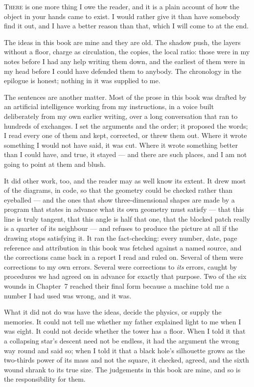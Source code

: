 
\lettrine{T}{here} is one more thing I owe the reader, and it is a plain account of how the object in your hands came to exist. I would rather give it than have somebody find it out, and I have a better reason than that, which I will come to at the end.

The ideas in this book are mine and they are old. The shadow push, the layers without a floor, charge as circulation, the copies, the local ratio: those were in my notes before I had any help writing them down, and the earliest of them were in my head before I could have defended them to anybody. The chronology in the epilogue is honest; nothing in it was supplied to me.

The sentences are another matter. Most of the prose in this book was drafted by an artificial intelligence working from my instructions, in a voice built deliberately from my own earlier writing, over a long conversation that ran to hundreds of exchanges. I set the arguments and the order; it proposed the words; I read every one of them and kept, corrected, or threw them out. Where it wrote something I would not have said, it was cut. Where it wrote something better than I could have, and true, it stayed --- and there are such places, and I am not going to point at them and blush.

It did other work, too, and the reader may as well know its extent. It drew most of the diagrams, in code, so that the geometry could be checked rather than eyeballed --- and the ones that show three-dimensional shapes are made by a program that states in advance what its own geometry must satisfy --- that this line is truly tangent, that this angle is half that one, that the blocked patch really is a quarter of its neighbour --- and refuses to produce the picture at all if the drawing stops satisfying it. It ran the fact-checking: every number, date, page reference and attribution in this book was fetched against a named source, and the corrections came back in a report I read and ruled on. Several of them were corrections to my own errors. Several were corrections to \emph{its} errors, caught by procedures we had agreed on in advance for exactly that purpose. Two of the six wounds in Chapter~7 reached their final form because a machine told me a number I had used was wrong, and it was.

What it did not do was have the ideas, decide the physics, or supply the memories. It could not tell me whether my father explained light to me when I was eight. It could not decide whether the tower has a floor. When I told it that a collapsing star's descent need not be endless, it had the argument the wrong way round and said so; when I told it that a black hole's silhouette grows as the two-thirds power of its mass and not the square, it checked, agreed, and the sixth wound shrank to its true size. The judgements in this book are mine, and so is the responsibility for them.

